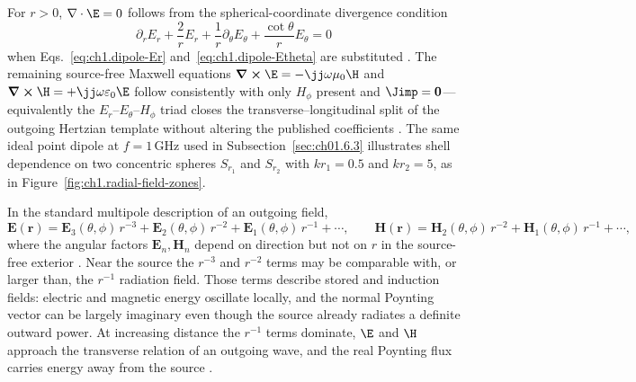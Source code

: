 For $r>0$, $\nabla\cdot\E=0$ follows from the spherical-coordinate divergence condition
\[
\partial_r E_r+\frac{2}{r}E_r+\frac{1}{r}\partial_\theta E_\theta+\frac{\cot\theta}{r}E_\theta=0
\]
when Eqs.~\eqref{eq:ch1.dipole-Er} and~\eqref{eq:ch1.dipole-Etheta} are substituted \cite{stratton1941}. The remaining source-free Maxwell equations $\curl\E=-\jj\omega\mu_0\H$ and $\curl\H=+\jj\omega\varepsilon_0\E$ follow consistently with only $H_\phi$ present and
$\Jimp=\mathbf{0}$---equivalently the $E_r$--$E_\theta$--$H_\phi$ triad closes the
transverse--longitudinal split of the outgoing Hertzian template without altering the
published coefficients \cite{stratton1941,harrington2001}. The same ideal point dipole at
$f=1\,\mathrm{GHz}$ used in Subsection~\ref{sec:ch01.6.3} illustrates shell dependence on
two concentric spheres $S_{r_1}$ and $S_{r_2}$ with $kr_1=0.5$ and $kr_2=5$, as in Figure~\ref{fig:ch1.radial-field-zones}.

In the standard multipole description of an outgoing field,
\begin{equation}
\label{eq:ch1.ex64-multipole-radial}
\mathbf{E}(\mathbf{r})=\mathbf{E}_3(\theta,\phi)\,r^{-3}+\mathbf{E}_2(\theta,\phi)\,r^{-2}+\mathbf{E}_1(\theta,\phi)\,r^{-1}+\cdots,
\qquad
\mathbf{H}(\mathbf{r})=\mathbf{H}_2(\theta,\phi)\,r^{-2}+\mathbf{H}_1(\theta,\phi)\,r^{-1}+\cdots,
\end{equation}
where the angular factors $\mathbf{E}_n,\mathbf{H}_n$ depend on direction but not on $r$ in the source-free exterior \cite{stratton1941}. Near the source the $r^{-3}$ and $r^{-2}$ terms may be comparable with, or larger than, the $r^{-1}$ radiation field. Those terms describe stored and induction fields: electric and magnetic energy oscillate locally, and the normal Poynting vector can be largely imaginary even though the source already radiates a definite outward power. At increasing distance the $r^{-1}$ terms dominate, $\E$ and $\H$ approach the transverse relation of an outgoing wave, and the real Poynting flux carries energy away from the source \cite{poynting1884}.

